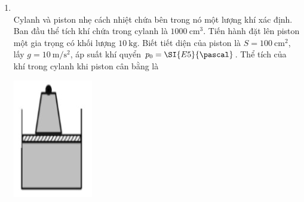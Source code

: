 \begin{enumerate}[label=\bfseries Câu \arabic*:, leftmargin=1.7cm]
\item {}\\
Cylanh và piston nhẹ cách nhiệt chứa bên trong nó một lượng khí xác định. Ban đầu thể tích khí chứa trong cylanh là $\SI{1000}{\centi\meter^3}$. Tiến hành đặt lên piston một gia trọng có khối lượng $\SI{10}{\kilogram}$. Biết tiết diện của piston là $S=\SI{100}{\centi\meter^2}$, lấy $g=\SI{10}{\meter/\second^2}$, áp suất khí quyển $p_0=\SI{E5}{\pascal}$. Thể tích của khí trong cylanh khi piston cân bằng là
\begin{center}
	\includegraphics[width=0.1\linewidth]{../figs/VN12-Y24-PH-SYL-010P-4}
\end{center}


\end{enumerate}
